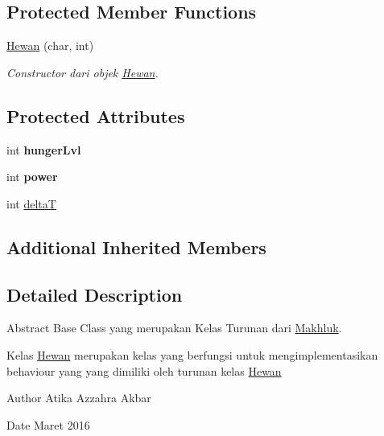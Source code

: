 \subsection*{Protected Member Functions}
\begin{DoxyCompactItemize}
\item 
\hyperlink{class_hewan_a5ea6a7a559331a71c86c59eaeb3809db}{Hewan} (char, int)
\begin{DoxyCompactList}\small\item\em Constructor dari objek \hyperlink{class_hewan}{Hewan}. \end{DoxyCompactList}\end{DoxyCompactItemize}
\subsection*{Protected Attributes}
\begin{DoxyCompactItemize}
\item 
int {\bfseries hunger\+Lvl}\hypertarget{class_hewan_ac2181643305f48f23c648b58d5b662b5}{}\label{class_hewan_ac2181643305f48f23c648b58d5b662b5}

\item 
int {\bfseries power}\hypertarget{class_hewan_a3fbf8081066fe2fb2b7b8cce149910a1}{}\label{class_hewan_a3fbf8081066fe2fb2b7b8cce149910a1}

\item 
int \hyperlink{class_hewan_a7d22294907eb5b03983fdb179b248c18}{deltaT}
\end{DoxyCompactItemize}
\subsection*{Additional Inherited Members}


\subsection{Detailed Description}
Abstract Base Class yang merupakan Kelas Turunan dari \hyperlink{class_makhluk}{Makhluk}. 

Kelas \hyperlink{class_hewan}{Hewan} merupakan kelas yang berfungsi untuk mengimplementasikan behaviour yang yang dimiliki oleh turunan kelas \hyperlink{class_hewan}{Hewan} \begin{DoxyAuthor}{Author}
Atika Azzahra Akbar 
\end{DoxyAuthor}
\begin{DoxyDate}{Date}
Maret 2016 
\end{DoxyDate}


